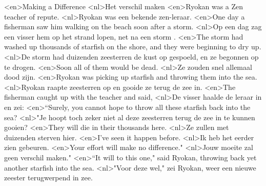 <en>Making a Difference
<nl>Het verschil maken
<en>Ryokan was a Zen teacher of repute.
<nl>Ryokan was een bekende zen-leraar.
<en>One day a fisherman saw him walking on the beach soon after a storm.
<nl>Op een dag zag een visser hem op het strand lopen, net na een storm .
<en>The storm had washed up thousands of starfish on the shore, and they were beginning to dry up.
<nl>De storm had duizenden zeesterren  de kust op gespoeld, en ze begonnen op te drogen.
<en>Soon all of them would be dead.
<nl>Ze zouden snel allemaal dood zijn.
<en>Ryokan was picking up starfish and throwing them into the sea.
<nl>Ryokan raapte zeesterren op en gooide ze terug de zee in.
<en>The fisherman caught up with the teacher and said, 
<nl>De visser haalde de leraar in en zei: 
<en>“Surely, you cannot hope to throw all these starfish back into the sea?
<nl>"Je hoopt toch zeker  niet al deze zeesterren terug  de zee in te kunnen gooien?
<en>They will die in their thousands here.
<nl>Ze zullen met duizenden sterven hier.
<en>I’ve seen it happen before.
<nl>Ik heb het eerder zien gebeuren.
<en>Your effort will make no difference."
<nl>Jouw moeite zal geen verschil maken."
<en>“It will to this one," said Ryokan, throwing back yet another starfish into the sea.
<nl>"Voor deze wel," zei Ryokan, weer een nieuwe  zeester terugwerpend in zee.
